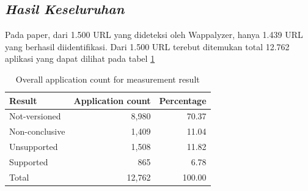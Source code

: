 \subsection{\textit{Hasil Keseluruhan}}
Pada paper\cite{pascal}, dari 1.500 URL yang dideteksi oleh Wappalyzer, hanya 1.439 URL yang berhasil diidentifikasi. Dari 1.500 URL terebut ditemukan total 12.762 aplikasi yang dapat dilihat pada tabel \ref{table:apr}
\begin{table}[h!]
	\centering
	\begin{tabular}{lrr} 
		\hline
		\textbf{Result} & \textbf{Application count} & \textbf{Percentage}\\
		\hline
		Not-versioned & 8,980 & 70.37\\
		Non-conclusive & 1,409 & 11.04\\
		Unsupported & 1,508 & 11.82\\
		Supported & 865 & 6.78\\
		\hline
		Total & 12,762 & 100.00\\
		\hline
		
	\end{tabular}
	\caption{Overall application count for measurement result}
	\label{table:apr}
\end{table}